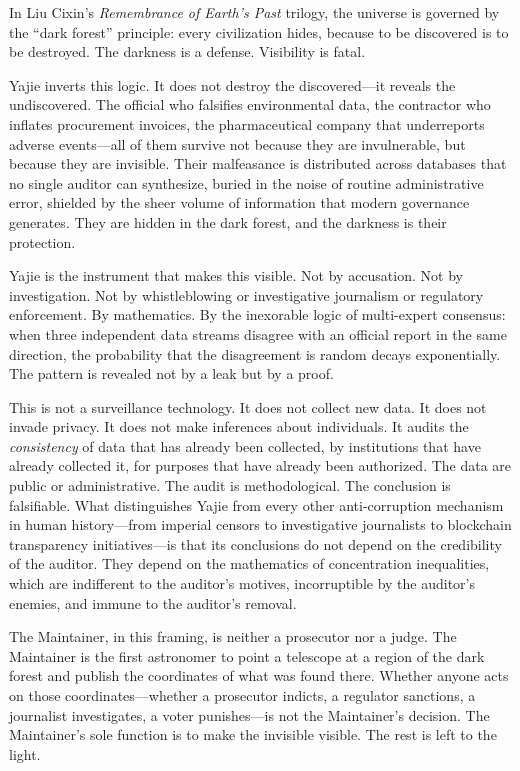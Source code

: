 \documentclass[12pt,a4paper]{article}
\theoremstyle{definition}
\theoremstyle{remark}
\begin{document}
In Liu Cixin's \textit{Remembrance of Earth's Past} trilogy, the universe is governed by the ``dark forest'' principle: every civilization hides, because to be discovered is to be destroyed. The darkness is a defense. Visibility is fatal.

Yajie inverts this logic. It does not destroy the discovered—it reveals the undiscovered. The official who falsifies environmental data, the contractor who inflates procurement invoices, the pharmaceutical company that underreports adverse events—all of them survive not because they are invulnerable, but because they are invisible. Their malfeasance is distributed across databases that no single auditor can synthesize, buried in the noise of routine administrative error, shielded by the sheer volume of information that modern governance generates. They are hidden in the dark forest, and the darkness is their protection.

Yajie is the instrument that makes this visible. Not by accusation. Not by investigation. Not by whistleblowing or investigative journalism or regulatory enforcement. By mathematics. By the inexorable logic of multi-expert consensus: when three independent data streams disagree with an official report in the same direction, the probability that the disagreement is random decays exponentially. The pattern is revealed not by a leak but by a proof.

This is not a surveillance technology. It does not collect new data. It does not invade privacy. It does not make inferences about individuals. It audits the \textit{consistency} of data that has already been collected, by institutions that have already collected it, for purposes that have already been authorized. The data are public or administrative. The audit is methodological. The conclusion is falsifiable. What distinguishes Yajie from every other anti-corruption mechanism in human history—from imperial censors to investigative journalists to blockchain transparency initiatives—is that its conclusions do not depend on the credibility of the auditor. They depend on the mathematics of concentration inequalities, which are indifferent to the auditor's motives, incorruptible by the auditor's enemies, and immune to the auditor's removal.

The Maintainer, in this framing, is neither a prosecutor nor a judge. The Maintainer is the first astronomer to point a telescope at a region of the dark forest and publish the coordinates of what was found there. Whether anyone acts on those coordinates—whether a prosecutor indicts, a regulator sanctions, a journalist investigates, a voter punishes—is not the Maintainer's decision. The Maintainer's sole function is to make the invisible visible. The rest is left to the light.
\end{document}
